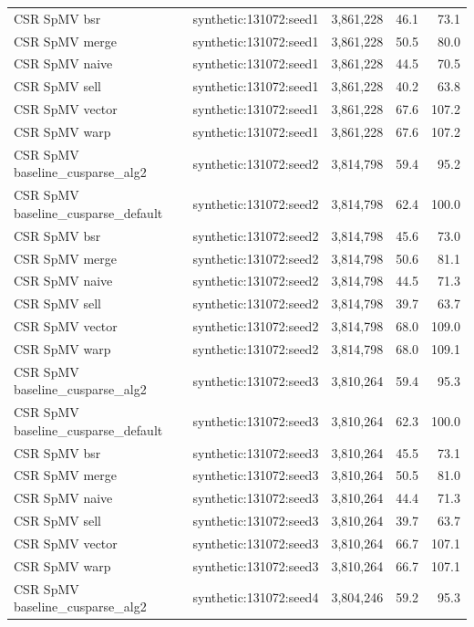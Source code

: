 \begin{tabular}{lllrr}
CSR SpMV bsr & synthetic:131072:seed1 & 3,861,228 & 46.1 & 73.1 \\
CSR SpMV merge & synthetic:131072:seed1 & 3,861,228 & 50.5 & 80.0 \\
CSR SpMV naive & synthetic:131072:seed1 & 3,861,228 & 44.5 & 70.5 \\
CSR SpMV sell & synthetic:131072:seed1 & 3,861,228 & 40.2 & 63.8 \\
CSR SpMV vector & synthetic:131072:seed1 & 3,861,228 & 67.6 & 107.2 \\
CSR SpMV warp & synthetic:131072:seed1 & 3,861,228 & 67.6 & 107.2 \\
CSR SpMV baseline\_cusparse\_alg2 & synthetic:131072:seed2 & 3,814,798 & 59.4 & 95.2 \\
CSR SpMV baseline\_cusparse\_default & synthetic:131072:seed2 & 3,814,798 & 62.4 & 100.0 \\
CSR SpMV bsr & synthetic:131072:seed2 & 3,814,798 & 45.6 & 73.0 \\
CSR SpMV merge & synthetic:131072:seed2 & 3,814,798 & 50.6 & 81.1 \\
CSR SpMV naive & synthetic:131072:seed2 & 3,814,798 & 44.5 & 71.3 \\
CSR SpMV sell & synthetic:131072:seed2 & 3,814,798 & 39.7 & 63.7 \\
CSR SpMV vector & synthetic:131072:seed2 & 3,814,798 & 68.0 & 109.0 \\
CSR SpMV warp & synthetic:131072:seed2 & 3,814,798 & 68.0 & 109.1 \\
CSR SpMV baseline\_cusparse\_alg2 & synthetic:131072:seed3 & 3,810,264 & 59.4 & 95.3 \\
CSR SpMV baseline\_cusparse\_default & synthetic:131072:seed3 & 3,810,264 & 62.3 & 100.0 \\
CSR SpMV bsr & synthetic:131072:seed3 & 3,810,264 & 45.5 & 73.1 \\
CSR SpMV merge & synthetic:131072:seed3 & 3,810,264 & 50.5 & 81.0 \\
CSR SpMV naive & synthetic:131072:seed3 & 3,810,264 & 44.4 & 71.3 \\
CSR SpMV sell & synthetic:131072:seed3 & 3,810,264 & 39.7 & 63.7 \\
CSR SpMV vector & synthetic:131072:seed3 & 3,810,264 & 66.7 & 107.1 \\
CSR SpMV warp & synthetic:131072:seed3 & 3,810,264 & 66.7 & 107.1 \\
CSR SpMV baseline\_cusparse\_alg2 & synthetic:131072:seed4 & 3,804,246 & 59.2 & 95.3 \\

\end{tabular}

